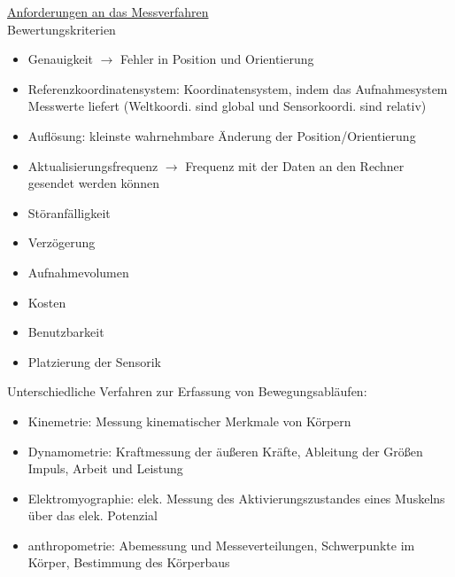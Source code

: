 \documentclass[a4paper,10pt,oneside]{article}
\begin{document}
\underline{Anforderungen an das Messverfahren} \\
Bewertungskriterien
	\begin{itemize}
		\item Genauigkeit $\rightarrow$ Fehler in Position und Orientierung
		\item Referenzkoordinatensystem: Koordinatensystem, indem das Aufnahmesystem Messwerte liefert (Weltkoordi. sind global und Sensorkoordi. sind relativ)
		\item Auflösung: kleinste wahrnehmbare Änderung der Position/Orientierung
		\item Aktualisierungsfrequenz $\rightarrow$ Frequenz mit der Daten an den Rechner gesendet werden können
		\item Störanfälligkeit	
		\item Verzögerung
		\item Aufnahmevolumen
		\item Kosten
		\item Benutzbarkeit
		\item Platzierung der Sensorik
	\end{itemize}

Unterschiedliche Verfahren zur Erfassung von Bewegungsabläufen:
	\begin{itemize}
		\item Kinemetrie: Messung kinematischer Merkmale von Körpern
		\item Dynamometrie: Kraftmessung der äußeren Kräfte, Ableitung der Größen Impuls, Arbeit und Leistung
		\item Elektromyographie: elek. Messung des Aktivierungszustandes eines Muskelns über das elek. Potenzial
		\item anthropometrie: Abemessung und Messeverteilungen, Schwerpunkte im Körper, Bestimmung des Körperbaus
	\end{itemize}
\end{document}
